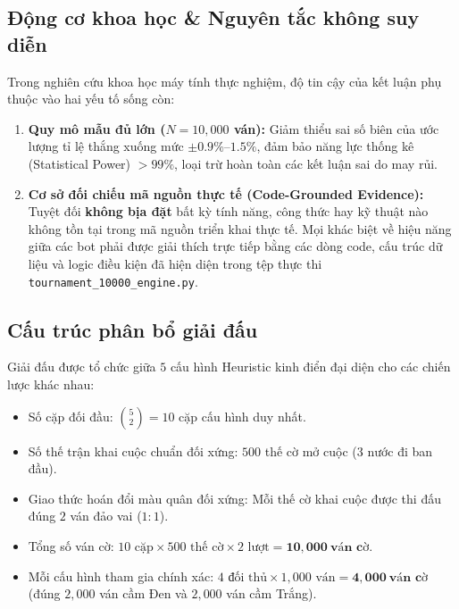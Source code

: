\documentclass[11pt,a4paper]{article}
\begin{document}
\subsection{Động cơ khoa học \& Nguyên tắc không suy diễn}
Trong nghiên cứu khoa học máy tính thực nghiệm, độ tin cậy của kết luận phụ thuộc vào hai yếu tố sống còn:
\begin{enumerate}
    \item \textbf{Quy mô mẫu đủ lớn ($N = 10{,}000$ ván):} Giảm thiểu sai số biên của ước lượng tỉ lệ thắng xuống mức $\pm 0.9\%\text{--}1.5\%$, đảm bảo năng lực thống kê (Statistical Power) $> 99\%$, loại trừ hoàn toàn các kết luận sai do may rủi.
    \item \textbf{Cơ sở đối chiếu mã nguồn thực tế (Code-Grounded Evidence):} Tuyệt đối \textbf{không bịa đặt} bất kỳ tính năng, công thức hay kỹ thuật nào không tồn tại trong mã nguồn triển khai thực tế. Mọi khác biệt về hiệu năng giữa các bot phải được giải thích trực tiếp bằng các dòng code, cấu trúc dữ liệu và logic điều kiện đã hiện diện trong tệp thực thi \texttt{tournament\_10000\_engine.py}.
\end{enumerate}

\subsection{Cấu trúc phân bổ giải đấu}
Giải đấu được tổ chức giữa $5$ cấu hình Heuristic kinh điển đại diện cho các chiến lược khác nhau:
\begin{itemize}
    \item Số cặp đối đầu: $\binom{5}{2} = 10$ cặp cấu hình duy nhất.
    \item Số thế trận khai cuộc chuẩn đối xứng: $500$ thế cờ mở cuộc ($3$ nước đi ban đầu).
    \item Giao thức hoán đổi màu quân đối xứng: Mỗi thế cờ khai cuộc được thi đấu đúng $2$ ván đảo vai ($1:1$).
    \item Tổng số ván cờ: $10 \text{ cặp} \times 500 \text{ thế cờ} \times 2 \text{ lượt} = \mathbf{10{,}000\ \text{ván cờ}}$.
    \item Mỗi cấu hình tham gia chính xác: $4 \text{ đối thủ} \times 1{,}000 \text{ ván} = \mathbf{4{,}000\ \text{ván cờ}}$ (đúng $2{,}000$ ván cầm Đen và $2{,}000$ ván cầm Trắng).
\end{itemize}

\end{document}
